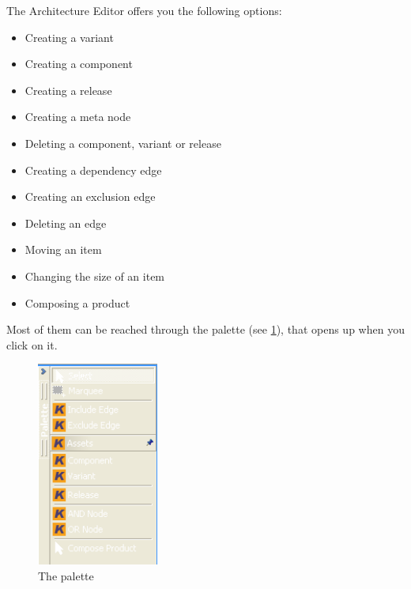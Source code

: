The Architecture Editor offers you the following options:
\begin{itemize}
	\item Creating a variant
	\item Creating a component
	\item Creating a release
	\item Creating a meta node
	\item Deleting a component, variant or release
	\item Creating a dependency edge
	\item Creating an exclusion edge
	\item Deleting an edge
	\item Moving an item
	\item Changing the size of an item
	\item Composing a product
\end{itemize}

Most of them can be reached through the palette (see \ref{palette}), that opens up when you click on it.

\begin{figure}[h!]
\begin{center}
\includegraphics[width=4cm]{palette.png}
   \caption{The palette}
\label{palette}
\end{center}
\end{figure}\par


